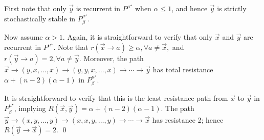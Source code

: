 First note that only $ \vec{y}$ is recurrent in $P^{\mu^\star}$ when $\alpha \leq 1$, and hence $ \vec{y}$ is strictly stochastically stable in $P^{\mu^\star}_\beta$.

Now assume $\alpha > 1.$ Again, it is straightforward to verify that only $\vec{x}$ and $ \vec{y}$ are recurrent in $P^{\mu^\star}$. Note that
$r(\vec{x}\to a) \geq \alpha, \forall a\neq \vec{x},$  and $ r( \vec{y}\to a) =2, \forall a\neq  \vec{y}.$
Moreover, the path 
$\vec{x}\to(y,x,\ldots,x)\to (y,y,x,\ldots,x)\to\cdots\to  \vec{y}$
has total resistance $\alpha+(n-2)(\alpha-1)$ in $P^{\mu^\star}_\beta$. 

It is straightforward to verify that this is the least resistance path from $\vec{x}$ to $ \vec{y}$ in $P^{\mu^\star}_{\beta}$, implying 
$R(\vec{x}, \vec{y})= \alpha+(n-2)(\alpha-1).$
The path
$ \vec{y}\to(x,y,\ldots,y)\to (x,x,y,\ldots,y)\to\cdots\to \vec{x}$
has resistance 2; hence
$R( \vec{y}\to \vec{x}) = 2.$
\hfill\qed




